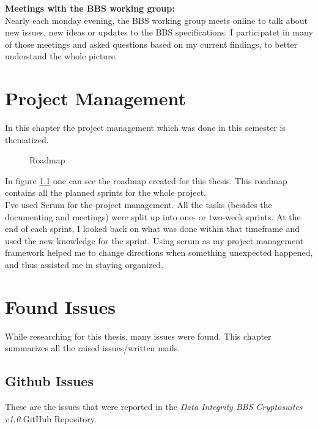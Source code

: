 \documentclass[
	a4paper               %
	,BCOR=0mm            %
	,bibliography=totoc   %
	,listof=totoc         %
	,monolingual
	,twoside=false
]{bfhthesis}              %
\begin{document}
\noindent
\textbf{Meetings with the BBS working group:}\\
Nearly each monday evening, the BBS working group meets online to talk about new issues, new ideas or updates to the BBS specifications. I participatet in many of those meetings and asked questions based on my current findings, to better understand the whole picture.


\chapter{Project Management}
In this chapter the project management which was done in this semester is thematized.

\begin{figure}[h]
	\centering
	\label{fig:roadmap}
	\caption{Roadmap}
\end{figure}

In figure \ref{fig:roadmap} one can see the roadmap created for this thesis. This roadmap contains all the planned sprints for the whole project.\\

I've used Scrum for the project management. All the tasks (besides the documenting and meetings) were split up into one- or two-week sprints. At the end of each sprint, I looked back on what was done within that timeframe and used the new knowledge for the sprint. Using scrum as my project management framework helped me to change directions when something unexpected happened, and thus assisted me in staying organized.


\chapter{Found Issues}
While researching for this thesis, many issues were found. This chapter summarizes all the raised issues/written mails.

\section{Github Issues}
These are the issues that were reported in the \textit{Data Integrity BBS Cryptosuites v1.0}\cite{bbsvc} GitHub Repository.\\
\end{document}
